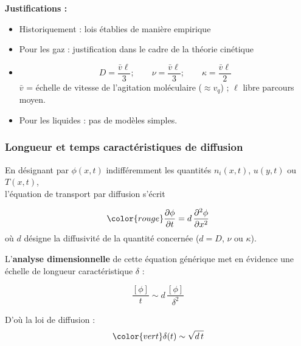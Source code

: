 {\begin{frame}{\insertsubsubsectionhead}
\pause
\bigskip 

{\bf  Justifications :}
\medskip
\begin{itemize}[<+-| alert@+>]
\item Historiquement : lois établies de manière empirique

\item Pour les gaz : justification dans le cadre de la théorie cinétique 

\item[]
$$
D = \frac{ \bar{v} \ell}{3} ; \qquad 
\nu = \frac{ \bar{v} \ell}{3} ; \qquad 
\kappa = \frac{ \bar{v} \ell}{2}
$$
$\bar{v}$ = échelle de vitesse de l'agitation moléculaire ($\approx v_q$) ; $\ell$ libre parcours moyen.



\item Pour les liquides : pas de modèles simples.
\end{itemize}


\end{frame}

\subsubsection{Longueur et temps caractéristiques de diffusion}

\begin{frame}{\insertsubsubsectionhead}

\pause

\small

En désignant par $\phi(x, t)$ indifféremment les quantités $n_i(x, t)$, $u(y, t)$ ou $T(x, t)$,
\\
l'équation de transport par diffusion s'écrit

$$
\color{rouge} \dpdt{\phi} = d \, \ddpdx{\phi}
$$
\medskip
o\`u $d$ désigne la diffusivité de la quantité concernée ($d = D$, $\nu$ ou $\kappa$).

\medskip

\pause

L'\textbf{analyse dimensionnelle} de cette équation générique met en évidence 
une \textcolor{rouge}{échelle de longueur caractéristique} $\delta$ :

$$
	\frac{[\phi]}{t} \sim d \, \frac{[\phi]}{\delta^2}
$$

D'o\`u la loi de diffusion :
$$
	\color{vert} \delta(t) \sim \sqrt{d\, t}
$$


\end{frame}}

